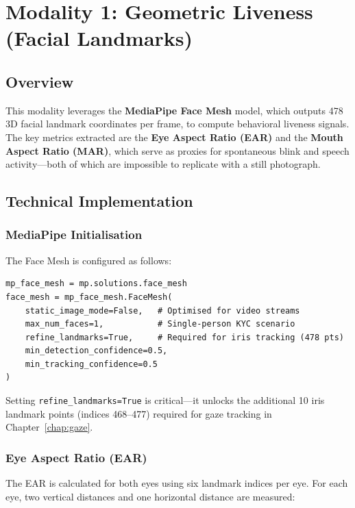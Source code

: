 \documentclass[12pt,a4paper]{report}
\begin{document}
\chapter{Modality 1: Geometric Liveness (Facial Landmarks)}

\section{Overview}
This modality leverages the \textbf{MediaPipe Face Mesh} model, which outputs 478 3D facial landmark coordinates per frame, to compute behavioral liveness signals. The key metrics extracted are the \textbf{Eye Aspect Ratio (EAR)} and the \textbf{Mouth Aspect Ratio (MAR)}, which serve as proxies for spontaneous blink and speech activity---both of which are impossible to replicate with a still photograph.

\section{Technical Implementation}

\subsection{MediaPipe Initialisation}
The Face Mesh is configured as follows:

\begin{lstlisting}[style=pythonstyle, caption={MediaPipe FaceMesh Configuration}]
mp_face_mesh = mp.solutions.face_mesh
face_mesh = mp_face_mesh.FaceMesh(
    static_image_mode=False,   # Optimised for video streams
    max_num_faces=1,           # Single-person KYC scenario
    refine_landmarks=True,     # Required for iris tracking (478 pts)
    min_detection_confidence=0.5,
    min_tracking_confidence=0.5
)
\end{lstlisting}

Setting \texttt{refine\_landmarks=True} is critical---it unlocks the additional 10 iris landmark points (indices 468--477) required for gaze tracking in Chapter~\ref{chap:gaze}.

\subsection{Eye Aspect Ratio (EAR)}
The EAR is calculated for both eyes using six landmark indices per eye. For each eye, two vertical distances and one horizontal distance are measured:
\end{document}
